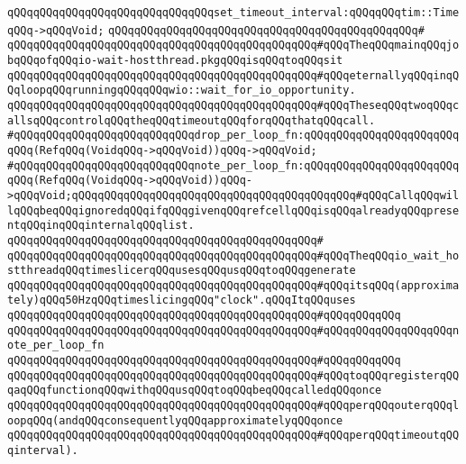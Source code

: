 \verb|qQQqqQQqqQQqqQQqqQQqqQQqqQQqqQQqset_timeout_interval:qQQqqQQqtim::TimeqQQq->qQQqVoid;|\newline
\verb|qQQqqQQqqQQqqQQqqQQqqQQqqQQqqQQqqQQqqQQqqQQqqQQq#|\newline
\verb|qQQqqQQqqQQqqQQqqQQqqQQqqQQqqQQqqQQqqQQqqQQqqQQq#qQQqTheqQQqmainqQQqjobqQQqofqQQqio-wait-hostthread.pkgqQQqisqQQqtoqQQqsit|\newline
\verb|qQQqqQQqqQQqqQQqqQQqqQQqqQQqqQQqqQQqqQQqqQQqqQQq#qQQqeternallyqQQqinqQQqloopqQQqrunningqQQqqQQqwio::wait_for_io_opportunity.|\newline
\verb|qQQqqQQqqQQqqQQqqQQqqQQqqQQqqQQqqQQqqQQqqQQqqQQq#qQQqTheseqQQqtwoqQQqcallsqQQqcontrolqQQqtheqQQqtimeoutqQQqforqQQqthatqQQqcall.|\newline
\newline
\verb|#qQQqqQQqqQQqqQQqqQQqqQQqqQQqdrop_per_loop_fn:qQQqqQQqqQQqqQQqqQQqqQQqqQQq(RefqQQq(VoidqQQq->qQQqVoid))qQQq->qQQqVoid;|\newline
\verb|#qQQqqQQqqQQqqQQqqQQqqQQqqQQqnote_per_loop_fn:qQQqqQQqqQQqqQQqqQQqqQQqqQQq(RefqQQq(VoidqQQq->qQQqVoid))qQQq->qQQqVoid;qQQqqQQqqQQqqQQqqQQqqQQqqQQqqQQqqQQqqQQqqQQq#qQQqCallqQQqwillqQQqbeqQQqignoredqQQqifqQQqgivenqQQqrefcellqQQqisqQQqalreadyqQQqpresentqQQqinqQQqinternalqQQqlist.|\newline
\verb|qQQqqQQqqQQqqQQqqQQqqQQqqQQqqQQqqQQqqQQqqQQqqQQq#|\newline
\verb|qQQqqQQqqQQqqQQqqQQqqQQqqQQqqQQqqQQqqQQqqQQqqQQq#qQQqTheqQQqio_wait_hostthreadqQQqtimeslicerqQQqusesqQQqusqQQqtoqQQqgenerate|\newline
\verb|qQQqqQQqqQQqqQQqqQQqqQQqqQQqqQQqqQQqqQQqqQQqqQQq#qQQqitsqQQq(approximately)qQQq50HzqQQqtimeslicingqQQq"clock".qQQqItqQQquses|\newline
\verb|qQQqqQQqqQQqqQQqqQQqqQQqqQQqqQQqqQQqqQQqqQQqqQQq#qQQqqQQqqQQq|\newline
\verb|qQQqqQQqqQQqqQQqqQQqqQQqqQQqqQQqqQQqqQQqqQQqqQQq#qQQqqQQqqQQqqQQqqQQqnote_per_loop_fn|\newline
\verb|qQQqqQQqqQQqqQQqqQQqqQQqqQQqqQQqqQQqqQQqqQQqqQQq#qQQqqQQqqQQq|\newline
\verb|qQQqqQQqqQQqqQQqqQQqqQQqqQQqqQQqqQQqqQQqqQQqqQQq#qQQqtoqQQqregisterqQQqaqQQqfunctionqQQqwithqQQqusqQQqtoqQQqbeqQQqcalledqQQqonce|\newline
\verb|qQQqqQQqqQQqqQQqqQQqqQQqqQQqqQQqqQQqqQQqqQQqqQQq#qQQqperqQQqouterqQQqloopqQQq(andqQQqconsequentlyqQQqapproximatelyqQQqonce|\newline
\verb|qQQqqQQqqQQqqQQqqQQqqQQqqQQqqQQqqQQqqQQqqQQqqQQq#qQQqperqQQqtimeoutqQQqinterval).|\newline
